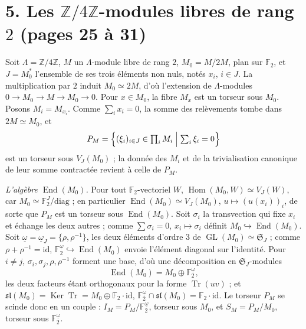 \documentclass[11pt,a4paper]{article}
\begin{document}
\section*{5. Les $\mathbb{Z}/4\mathbb{Z}$-modules libres de rang $2$ (pages 25 à 31)}

Soit $\Lambda = \mathbb{Z}/4\mathbb{Z}$, $M$ un $\Lambda$-module libre de rang
$2$, $M_0 = M/2M$, plan sur $\mathbb{F}_2$, et $J = M_0^{*}$ l'ensemble de ses
trois éléments non nuls, notés $x_i$, $i \in J$. La multiplication par $2$
induit $M_0 \simeq 2M$, d'où l'extension de $\Lambda$-modules
$0 \to M_0 \to M \to M_0 \to 0$. Pour $x \in M_0$, la fibre $M_x$ est un torseur
sous $M_0$. Posons $M_i = M_{x_i}$. Comme $\sum_i x_i = 0$, la somme des
relèvements tombe dans $2M \simeq M_0$, et
\[
P_M = \Bigl\{ (\xi_i)_{i \in J} \in \textstyle\prod_i M_i \Bigm|
\sum_i \xi_i = 0 \Bigr\}
\]
est un torseur sous $V_J(M_0)$ ; la donnée des $M_i$ et de la trivialisation
canonique de leur somme contractée revient à celle de $P_M$.

\emph{L'algèbre $\operatorname{End}(M_0)$.} Pour tout $\mathbb{F}_2$-vectoriel
$W$, $\operatorname{Hom}(M_0, W) \simeq V_J(W)$, car
$M_0 \simeq \mathbb{F}_2^{J}/\mathrm{diag}$ ; en particulier
$\operatorname{End}(M_0) \simeq V_J(M_0)$, $u \mapsto (u(x_i))_i$, de sorte que
$P_M$ est un torseur sous $\operatorname{End}(M_0)$. Soit $\sigma_i$ la
transvection qui fixe $x_i$ et échange les deux autres ; comme
$\sum \sigma_i = 0$, $x_i \mapsto \sigma_i$ définit $M_0 \hookrightarrow
\operatorname{End}(M_0)$. Soit $\underline{\omega} = \underline{\omega}_J =
\{\rho, \rho^{-1}\}$, les deux éléments d'ordre $3$ de
$\operatorname{GL}(M_0) \simeq \mathfrak{S}_J$ ; comme $\rho + \rho^{-1} =
\mathrm{id}$, $\mathbb{F}_2^{\underline{\omega}} \hookrightarrow
\operatorname{End}(M_0)$ envoie l'élément diagonal sur l'identité. Pour
$i \neq j$, $\sigma_i, \sigma_j, \rho, \rho^{-1}$ forment une base, d'où une
décomposition en $\mathfrak{S}_J$-modules
\[
\operatorname{End}(M_0) = M_0 \oplus \mathbb{F}_2^{\underline{\omega}},
\]
les deux facteurs étant orthogonaux pour la forme $\operatorname{Tr}(uv)$ ; et
$\mathfrak{sl}(M_0) = \operatorname{Ker} \operatorname{Tr} = M_0 \oplus
\mathbb{F}_2 \cdot \mathrm{id}$, $\mathbb{F}_2^{\underline{\omega}} \cap
\mathfrak{sl}(M_0) = \mathbb{F}_2 \cdot \mathrm{id}$. Le torseur $P_M$ se
scinde donc en un couple : $I_M = P_M / \mathbb{F}_2^{\underline{\omega}}$,
torseur sous $M_0$, et $S_M = P_M / M_0$, torseur sous
$\mathbb{F}_2^{\underline{\omega}}$.
\end{document}
